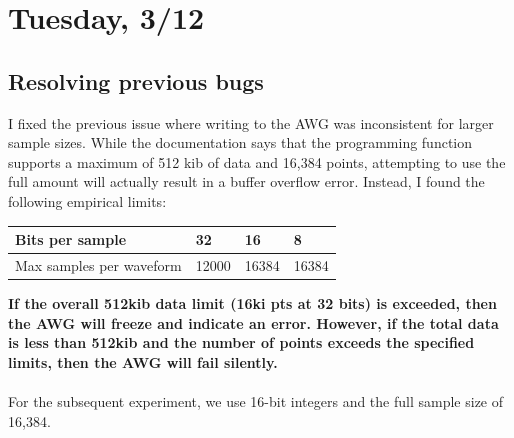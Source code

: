 \documentclass{article}
\begin{document}
    \section*{Tuesday, 3/12} 
    \subsection*{Resolving previous bugs}
    I fixed the previous issue where writing to the AWG was inconsistent for larger sample sizes. While the documentation says that the programming function supports a maximum of 512 kib of data and 16,384 points, attempting to use the full amount will actually result in a buffer overflow error. Instead, I found the following empirical limits:
    \begin{table}[H]
    \centering
    \begin{tabular}{|l|l|l|l|}
    \hline
    Bits per sample & 32 & 16 & 8 \\ \hline
    Max samples per waveform & 12000 & 16384 & 16384 \\ \hline
    \end{tabular}
    \end{table}
    \textbf{If the overall 512kib data limit (16ki pts at 32 bits) is exceeded, then the AWG will freeze and indicate an error. However, if the total data is less than 512kib and the number of points exceeds the specified limits, then the AWG will fail silently.}\\\\
    For the subsequent experiment, we use 16-bit integers and the full sample size of 16,384.
\end{document}
